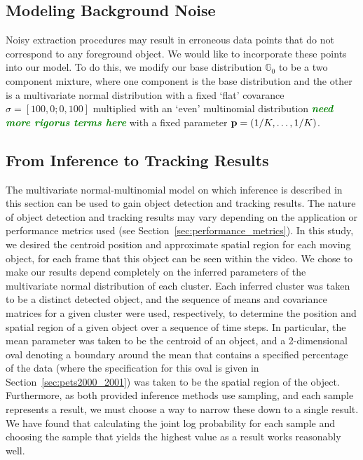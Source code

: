\documentclass[smallcondensed, final]{svjour3}
\newcommand{\willie}[1]{\textcolor{green}{\textsf{\emph{\textbf{\textcolor{green}{#1}}}}}}
\begin{document}
\subsection{Modeling Background Noise}

Noisy extraction procedures may result in erroneous data points that do not correspond to any foreground object. We would like to incorporate these points into our model. To do this, we modify our base distribution $\mathbb{G}_{0}$ to be a two component mixture, where one component is the base distribution and the other is a multivariate normal distribution with a fixed `flat' covarance $\sigma = [100, 0; 0, 100]$ multiplied with an `even' multinomial distribution \willie{need more rigorus terms here} with a fixed parameter $\bold{p} = (1/K, \ldots, 1/K)$.


\subsection{From Inference to Tracking Results}
\label{sec:inference_to_results}
The multivariate normal-multinomial model on which inference is described in this section can be used to gain object detection and tracking results. The nature of object detection and tracking results may vary depending on the application or performance metrics used (see Section~\ref{sec:performance_metrics}). In this study, we desired the centroid position and approximate spatial region for each moving object, for each frame that this object can be seen within the video. We chose to make our results depend completely on the inferred parameters of the multivariate normal distribution of each cluster. Each inferred cluster was taken to be a distinct detected object, and the sequence of means and covariance matrices for a given cluster were used, respectively, to determine the position and spatial region of a given object over a sequence of time steps. In particular, the mean parameter was taken to be the centroid of an object, and a 2-dimensional oval denoting a boundary around the mean that contains a specified percentage of the data (where the specification for this oval is given in Section~\ref{sec:pets2000_2001}) was taken to be the spatial region of the object. Furthermore, as both provided inference methods use sampling, and each sample represents a result, we must choose a way to narrow these down to a single result. We have found that calculating the joint log probability for each sample and choosing the sample that yields the highest value as a result works reasonably well.
\end{document}

